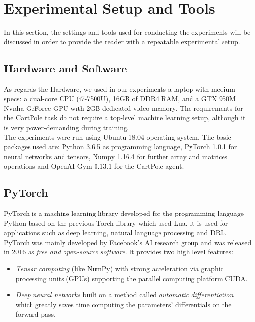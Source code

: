 \section{Experimental Setup and Tools} 

In this section, the settings and tools used for conducting the experiments will be discussed in order to provide the reader with a repeatable experimental setup.

\subsection{Hardware and Software}
\label{sec:hardwaresoftware}
As regards the Hardware, we used in our experiments a laptop with medium specs: a dual-core CPU (i7-7500U), 16GB of DDR4 RAM, and a GTX 950M Nvidia GeForce GPU with 2GB dedicated video memory. The requirements for the CartPole task do not require a top-level machine learning setup, although it is very power-demanding during training.
\\
\indent The experiments were run using Ubuntu 18.04 operating system. The basic packages used are: Python 3.6.5 as programming language, PyTorch 1.0.1 for neural networks and tensors, Numpy 1.16.4 for further array and matrices operations and OpenAI Gym 0.13.1 for the CartPole agent.

\subsection{PyTorch}

PyTorch is a machine learning library developed for the programming language Python based on the previous Torch library which used Lua. It is used for applications such as deep learning, natural language processing and DRL. 
\\
\indent PyTorch was mainly developed by Facebook's AI research group and was released in 2016 as \textit{free and open-source software}. It provides two high level features:

\begin{itemize}
	\item \textit{Tensor computing} (like NumPy) with strong acceleration via graphic processing units (GPUs) supporting the parallel computing platform CUDA.
	\item \textit{Deep neural networks} built on a method called \textit{automatic differentiation} which greatly saves time computing the parameters' differentials on the forward pass.

 \end{itemize}

